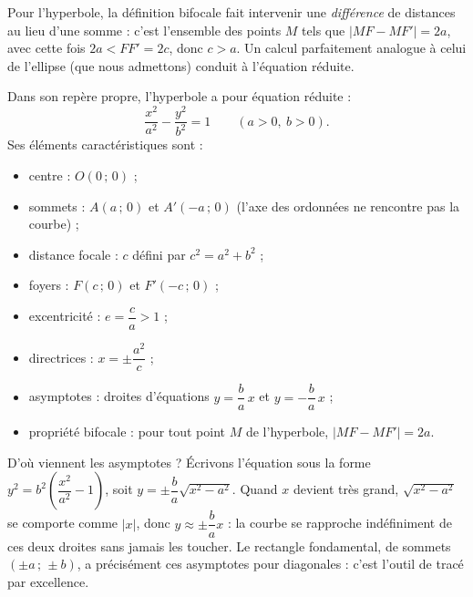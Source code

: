 \documentclass[11pt]{article}
\newcommand{\cle}[1]{{\popxbold\color{popdark}#1}}
\begin{document}
Pour l'hyperbole, la définition bifocale fait intervenir une \emph{différence} de distances au lieu d'une somme : c'est l'ensemble des points $M$ tels que $|MF - MF'| = 2a$, avec cette fois $2a < FF' = 2c$, donc $c > a$. Un calcul parfaitement analogue à celui de l'ellipse (que nous admettons) conduit à l'équation réduite.

\begin{propriete}
Dans son repère propre, l'hyperbole a pour équation réduite :
\[ \frac{x^2}{a^2} - \frac{y^2}{b^2} = 1 \qquad (a > 0,\ b > 0). \]
Ses éléments caractéristiques sont :
\begin{itemize}
\item \cle{centre} : $O(0\,;\,0)$ ;
\item \cle{sommets} : $A(a\,;\,0)$ et $A'(-a\,;\,0)$ (l'axe des ordonnées ne rencontre pas la courbe) ;
\item \cle{distance focale} : $c$ défini par $c^2 = a^2 + b^2$ ;
\item \cle{foyers} : $F(c\,;\,0)$ et $F'(-c\,;\,0)$ ;
\item \cle{excentricité} : $e = \dfrac{c}{a} > 1$ ;
\item \cle{directrices} : $x = \pm \dfrac{a^2}{c}$ ;
\item \cle{asymptotes} : droites d'équations $y = \dfrac{b}{a}\,x$ et $y = -\dfrac{b}{a}\,x$ ;
\item \cle{propriété bifocale} : pour tout point $M$ de l'hyperbole, $|MF - MF'| = 2a$.
\end{itemize}
\end{propriete}

D'où viennent les asymptotes ? Écrivons l'équation sous la forme $y^2 = b^2\left(\dfrac{x^2}{a^2} - 1\right)$, soit $y = \pm \dfrac{b}{a}\sqrt{x^2 - a^2}$. Quand $x$ devient très grand, $\sqrt{x^2 - a^2}$ se comporte comme $|x|$, donc $y \approx \pm \dfrac{b}{a} x$ : la courbe se rapproche indéfiniment de ces deux droites sans jamais les toucher. Le \cle{rectangle fondamental}, de sommets $(\pm a\,;\,\pm b)$, a précisément ces asymptotes pour diagonales : c'est l'outil de tracé par excellence.
\end{document}
